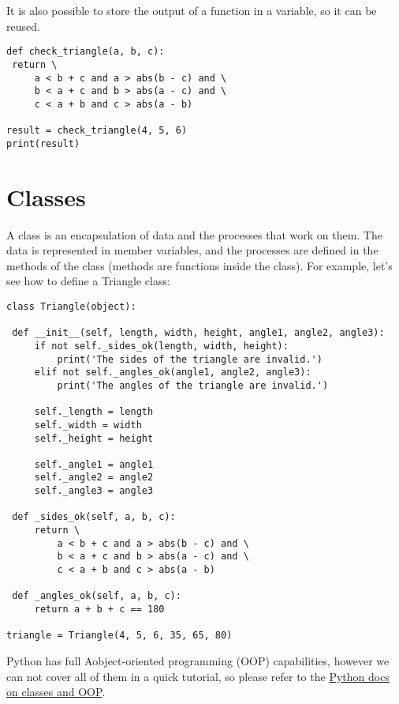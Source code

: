 It is also possible to store the output of a function in a variable, so
it can be reused.

\begin{verbatim}
def check_triangle(a, b, c):
 return \
     a < b + c and a > abs(b - c) and \
     b < a + c and b > abs(a - c) and \
     c < a + b and c > abs(a - b)

result = check_triangle(4, 5, 6)
print(result)
\end{verbatim}

\section{Classes}\label{classes}

A class is an encapsulation of data and the processes that work on them.
The data is represented in member variables, and the processes are
defined in the methods of the class (methods are functions inside the
class). For example, let's see how to define a Triangle class:

\begin{verbatim}
class Triangle(object):

 def __init__(self, length, width, height, angle1, angle2, angle3):
     if not self._sides_ok(length, width, height):
         print('The sides of the triangle are invalid.')
     elif not self._angles_ok(angle1, angle2, angle3):
         print('The angles of the triangle are invalid.')

     self._length = length
     self._width = width
     self._height = height

     self._angle1 = angle1
     self._angle2 = angle2
     self._angle3 = angle3

 def _sides_ok(self, a, b, c):
     return \
         a < b + c and a > abs(b - c) and \
         b < a + c and b > abs(a - c) and \
         c < a + b and c > abs(a - b)

 def _angles_ok(self, a, b, c):
     return a + b + c == 180

triangle = Triangle(4, 5, 6, 35, 65, 80)
\end{verbatim}

Python has full Aobject-oriented programming (OOP) capabilities, however
we can not cover all of them in a quick tutorial, so please refer to the
\href{https://docs.python.org/2.7/tutorial/classes.html}{Python docs on
classes and OOP}.
